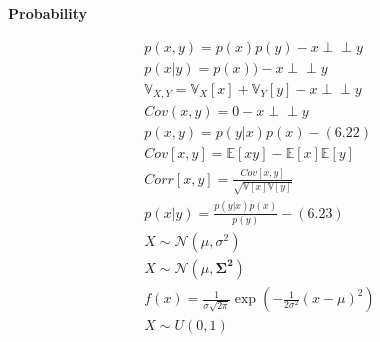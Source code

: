\documentclass[fleqn]{article}
\newcommand{\indep}{\perp \!\!\! \perp}
\begin{document}
\begin{minipage}[t]{0.33\textwidth}
\textbf{Probability}
\begin{center}
\begin{equation*}
\begin{split}
	p(x,y) = p(x)p(y) -  x \indep y\\
	p(x|y) = p(x)) -  x \indep y\\
	\mathbb{V}_{X,Y} =  \mathbb{V}_X[x] + \mathbb{V}_Y[y] - x \indep y\\
	Cov(x,y) = 0 - x \indep y\\
	p(x,y) = p(y|x)p(x) - (6.22)\\
Cov[x,y] = \mathbb{E}[xy]-\mathbb{E}[x]\mathbb{E}[y]\\
Corr[x,y] = \frac{Cov[x,y]}{\sqrt{\mathbb{V}[x] \mathbb{V}[y]}}\\
	p(x|y) = \frac{p(y|x)p(x)}{p(y)} - (6.23)\\
X\sim \mathcal{N}(\mu,\sigma^2)\\
X\sim \mathcal{N}(\mu, \boldsymbol{\Sigma^2})\\
f(x) = \frac{1}{\sigma\sqrt{2\pi}}\exp(-\frac{1}{2\sigma^2}(x-\mu)^2) \\
X \sim U(0, 1)\\
\end{split}		
\end{equation*}
\end{center}

\end{minipage}%
\end{document}
